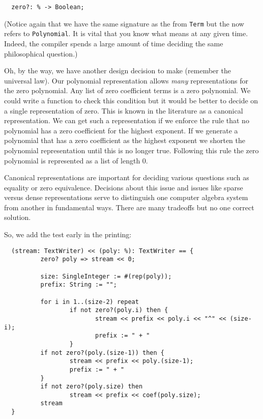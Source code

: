\begin{small}
\begin{verbatim}
  zero?: % -> Boolean;
\end{verbatim}
\end{small}

(Notice again that we have the same signature as the  from \verb"Term"
 but the \ttin{\%} now refers to \verb"Polynomial". It is vital that you know what
 \ttin{\%} means at any given time. Indeed, the compiler spends a large
 amount of time deciding the same philosophical question.)

Oh, by the way, we have another design decision to make (remember the
universal law). Our polynomial representation allows {\em many} representations
for the zero polynomial. Any list of zero coefficient terms is a zero
polynomial. We could write a function to check this condition but it
would be better to decide on a single representation of zero. This is
known in the literature as a canonical representation. We can get such
a representation if we enforce the rule that no polynomial has a zero
coefficient for the highest exponent. If we generate a polynomial that
has a zero coefficient as the highest exponent we shorten the polynomial
representation until this is no longer true. Following this rule the
zero polynomial is represented as a list of length 0. 

Canonical representations are important for deciding various questions
such as equality or zero equivalence. Decisions about this issue and
issues like sparse versus dense representations serve to distinguish
one computer algebra system from another in fundamental ways. There 
are many tradeoffs but no one correct solution.

So, we add the  test early in the printing:

\begin{small}
\begin{verbatim}
  (stream: TextWriter) << (poly: %): TextWriter == {
          zero? poly => stream << 0;

          size: SingleInteger := #(rep(poly));
          prefix: String := "";

          for i in 1..(size-2) repeat
                  if not zero?(poly.i) then {
                         stream << prefix << poly.i << "^" << (size-i);
                         prefix := " + "
                  }
          if not zero?(poly.(size-1)) then {
                  stream << prefix << poly.(size-1);
                  prefix := " + "
          }
          if not zero?(poly.size) then 
                  stream << prefix << coef(poly.size);
          stream
  }
\end{verbatim}
\end{small}


